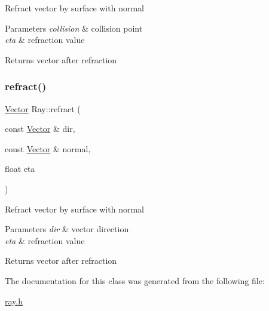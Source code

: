 Refract vector by surface with normal 
\begin{DoxyParams}{Parameters}
{\em collision} & collision point \\
\hline
{\em eta} & refraction value \\
\hline
\end{DoxyParams}
\begin{DoxyReturn}{Returns}
vector after refraction 
\end{DoxyReturn}
\mbox{\label{class_ray_a0f59bf2236d721bc337892989e9a6e4e}} 
\subsubsection{\texorpdfstring{refract()}{refract()}\hspace{0.1cm}{\footnotesize\ttfamily [2/2]}}
{\footnotesize\ttfamily \mbox{\hyperlink{struct_vector}{Vector}} Ray\+::refract (\begin{DoxyParamCaption}\item[{const \mbox{\hyperlink{struct_vector}{Vector}} \&}]{dir,  }\item[{const \mbox{\hyperlink{struct_vector}{Vector}} \&}]{normal,  }\item[{float}]{eta }\end{DoxyParamCaption})\hspace{0.3cm}{\ttfamily [inline]}}

Refract vector by surface with normal 
\begin{DoxyParams}{Parameters}
{\em dir} & vector direction \\
\hline
{\em eta} & refraction value \\
\hline
\end{DoxyParams}
\begin{DoxyReturn}{Returns}
vector after refraction 
\end{DoxyReturn}


The documentation for this class was generated from the following file\+:\begin{DoxyCompactItemize}
\item 
\mbox{\hyperlink{ray_8h}{ray.\+h}}\end{DoxyCompactItemize}
